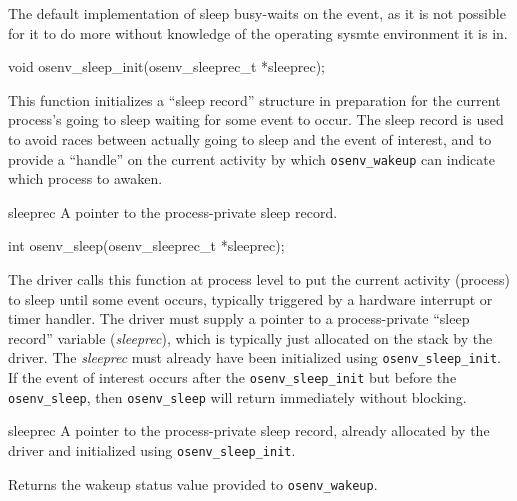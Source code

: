 The default implementation of sleep busy-waits on the event,
as it is not possible for it to do more without knowledge of
the operating sysmte environment it is in.

\begin{apisyn}

	\funcproto void osenv_sleep_init(osenv_sleeprec_t *sleeprec);
\end{apisyn}
\drvtoosn
\begin{apidesc}
	This function initializes a ``sleep record'' structure
	in preparation for the current process's going to sleep
	waiting for some event to occur.
	The sleep record is used to avoid races
	between actually going to sleep and the event of interest,
	and to provide a ``handle'' on the current activity
	by which {\tt osenv_wakeup} can indicate which process to awaken.
\end{apidesc}
\begin{apiparm}
	\item[sleeprec]
		A pointer to the process-private sleep record.
\end{apiparm}


\begin{apisyn}

	\funcproto int osenv_sleep(osenv_sleeprec_t *sleeprec);
\end{apisyn}
\drvtoosb
\begin{apidesc}
	The driver calls this function at process level
	to put the current activity (process) to sleep until some event occurs,
	typically triggered by a hardware interrupt or timer handler.
	The driver must supply a pointer
	to a process-private ``sleep record'' variable (\emph{sleeprec}),
	which is typically just allocated on the stack by the driver.
	The \emph{sleeprec} must already have been initialized
	using {\tt osenv_sleep_init}.
	If the event of interest occurs
	after the {\tt osenv_sleep_init} but before the {\tt osenv_sleep},
	then {\tt osenv_sleep} will return immediately without blocking.
\end{apidesc}
\begin{apiparm}
	\item[sleeprec]
		A pointer to the process-private sleep record,
		already allocated by the driver
		and initialized using {\tt osenv_sleep_init}.
\end{apiparm}
\begin{apiret}
	Returns the wakeup status value provided to {\tt osenv_wakeup}.
\end{apiret}


